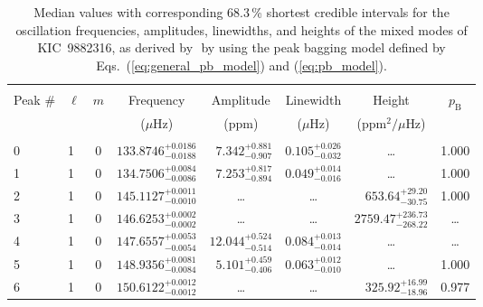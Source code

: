 \begin{table*}[!]
\caption{Median values with corresponding 68.3\,\% shortest credible intervals for the oscillation frequencies, amplitudes, linewidths, and heights of the mixed modes of KIC~9882316, as derived by \diamonds\,\,by using the peak bagging model defined by Eqs.~(\ref{eq:general_pb_model}) and (\ref{eq:pb_model}).}
\label{tab:9882316m}
\centering
\begin{tabular}{llcrrlrc}
\hline\hline
\\[-8pt]      
Peak \# & $\ell$ & $m$ & \multicolumn{1}{c}{Frequency} & \multicolumn{1}{c}{Amplitude} & \multicolumn{1}{c}{Linewidth} & \multicolumn{1}{c}{Height}& $p_\mathrm{B}$\\
 & & & \multicolumn{1}{c}{($\mu$Hz)} & \multicolumn{1}{c}{(ppm)} & \multicolumn{1}{c}{($\mu$Hz)} & \multicolumn{1}{c}{(ppm$^2/\mu$Hz)}\\
\hline \\[-8pt]
0 & 1 & 0 & $    133.8746_{-      0.0188}^{+      0.0186}$ & $       7.342_{-       0.907}^{+       0.881}$ & $       0.105_{-       0.032}^{+       0.026}$ & \multicolumn{1}{c}{\dots} & 1.000\\[1pt]
1 & 1 & 0 & $    134.7506_{-      0.0086}^{+      0.0084}$ & $       7.253_{-       0.894}^{+       0.817}$ & $       0.049_{-       0.016}^{+       0.014}$ & \multicolumn{1}{c}{\dots} & 1.000\\[1pt]

2 & 1 & 0 & $    145.1127_{-      0.0010}^{+      0.0011}$ & \multicolumn{1}{c}{\dots} & \multicolumn{1}{c}{\dots} & $      653.64_{-       30.75}^{+       29.20}$ & 1.000\\[1pt]
3 & 1 & 0 & $    146.6253_{-      0.0002}^{+      0.0002}$ & \multicolumn{1}{c}{\dots} & \multicolumn{1}{c}{\dots} & $     2759.47_{-      268.22}^{+      236.73}$ & \dots \\[1pt]
4 & 1 & 0 & $    147.6557_{-      0.0054}^{+      0.0053}$ & $      12.044_{-       0.514}^{+       0.524}$ & $       0.084_{-       0.014}^{+       0.013}$ & \multicolumn{1}{c}{\dots} & \dots \\[1pt]
5 & 1 & 0 & $    148.9356_{-      0.0084}^{+      0.0081}$ & $       5.101_{-       0.406}^{+       0.459}$ & $       0.063_{-       0.010}^{+       0.012}$ & \multicolumn{1}{c}{\dots} & 1.000\\[1pt]
6 & 1 & 0 & $    150.6122_{-      0.0012}^{+      0.0012}$ & \multicolumn{1}{c}{\dots} & \multicolumn{1}{c}{\dots} & $      325.92_{-       18.96}^{+       16.99}$ & 0.977\\[1pt]


\end{tabular}
\end{table*}
